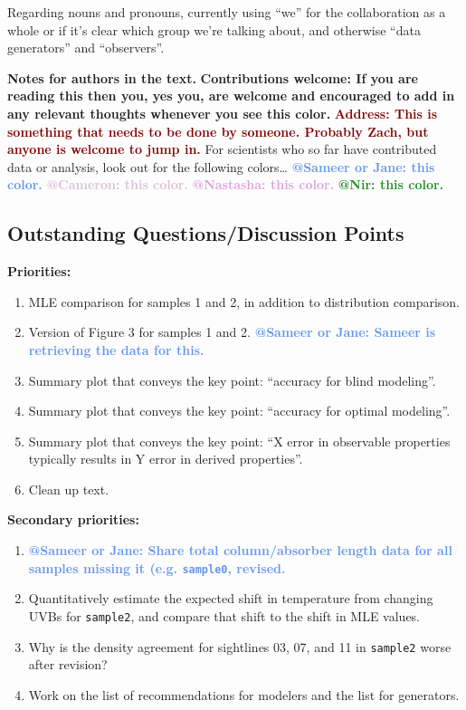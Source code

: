 \documentclass[fleqn,usenatbib]{mnras}
\makeatletter
\newcommand{\thoughts}[1]{\textcolor{BurntOrange}{\textbf{Contributions welcome: #1}}}
\newcommand{\todo}[1]{\textcolor{Maroon}{\textbf{Address: #1}}}
\newcommand{\atsameer}[1]{\textcolor{CornflowerBlue}{\textbf{@Sameer or Jane: #1}}}
\newcommand{\atcameron}[1]{\textcolor{Thistle}{\textbf{@Cameron: #1}}}
\newcommand{\atnastasha}[1]{\textcolor{Plum}{\textbf{@Nastasha: #1}}}
\newcommand{\atnir}[1]{\textcolor{ForestGreen}{\textbf{@Nir: #1}}}
\makeatother
\begin{document}
Regarding nouns and pronouns, currently using ``we'' for the collaboration as a whole or if it's clear which group we're talking about, and otherwise ``data generators'' and ``observers''. 

\textbf{Notes for authors in the text.}
\thoughts{If you are reading this then you, yes you, are welcome and encouraged to add in any relevant thoughts whenever you see this color.}
\todo{This is something that needs to be done by someone. Probably Zach, but anyone is welcome to jump in.}
For scientists who so far have contributed data or analysis, look out for the following colors\ldots
\atsameer{this color.}
\atcameron{this color.}
\atnastasha{this color.}
\atnir{this color.}

\subsection{Outstanding Questions/Discussion Points}

\textbf{Priorities:}
\begin{enumerate}
    \item MLE comparison for samples 1 and 2, in addition to distribution comparison.
    \item Version of Figure 3 for samples 1 and 2.
    \atsameer{Sameer is retrieving the data for this.}
    \item Summary plot that conveys the key point: ``accuracy for blind modeling''.
    \item Summary plot that conveys the key point: ``accuracy for optimal modeling''.
    \item Summary plot that conveys the key point: ``X error in observable properties typically results in Y error in derived properties''.
    \item Clean up text.
\end{enumerate}

\textbf{Secondary priorities:}
\begin{enumerate}
    \item \atsameer{Share total column/absorber length data for all samples missing it (e.g. \texttt{sample0}, revised.}
    \item Quantitatively estimate the expected shift in temperature from changing UVBs for \texttt{sample2}, and compare that shift to the shift in MLE values.
    \item Why is the density agreement for sightlines 03, 07, and 11 in \texttt{sample2} worse after revision?
    \item Work on the list of recommendations for modelers and the list for generators.
\end{enumerate}
\end{document}
